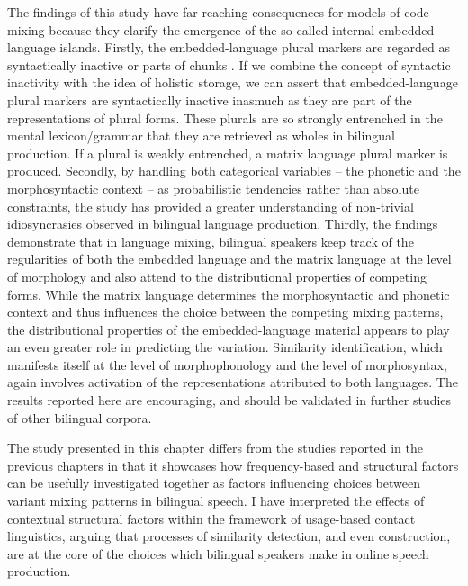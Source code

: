 The findings of this study have far-reaching consequences for models of code-mixing because they clarify the emergence of the so-called internal embedded-language islands. Firstly, the embedded-language plural markers are regarded as syntactically inactive \citep[92]{myers-scotton-contact-2002} or parts of chunks \citep[98]{backus-evidence-1999}. If we combine the concept of syntactic inactivity with the idea of holistic storage, we can assert that embedded-language plural markers are syntactically inactive inasmuch as they are part of the representations of plural forms. These plurals are so strongly entrenched in the mental lexicon/grammar that they are retrieved as wholes in bilingual production. If a plural is weakly entrenched, a matrix language plural marker is produced. Secondly, by handling both categorical variables -- the phonetic and the morphosyntactic context -- as probabilistic tendencies rather than absolute constraints, the study has provided a greater understanding of non-trivial idiosyncrasies observed in bilingual language production. Thirdly, the findings demonstrate that in language mixing, bilingual speakers keep track of the regularities of both the embedded language and the matrix language at the level of morphology and also attend to the distributional properties of competing forms. While the matrix language determines the morphosyntactic and phonetic context and thus influences the choice between the competing mixing patterns, the distributional properties of the embedded-language material appears to play an even greater role in predicting the variation. Similarity identification, which manifests itself at the level of morphophonology and the level of morphosyntax, again involves activation of the representations attributed to both languages. The results reported here are encouraging, and should be validated in further studies of other bilingual corpora.

The study presented in this chapter differs from the studies reported in the previous chapters in that it showcases how frequency-based and structural factors can be usefully investigated together as factors influencing choices between variant mixing patterns in bilingual speech. I have interpreted the effects of contextual structural factors within the framework of usage-based contact linguistics, arguing that processes of similarity detection, and even construction, are at the core of the choices which bilingual speakers make in online speech production.
